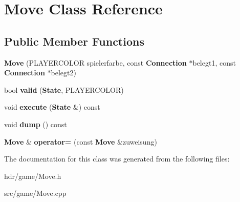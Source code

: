 \section{Move Class Reference}
\label{class_move}
\subsection*{Public Member Functions}
\begin{DoxyCompactItemize}
\item 
{\bfseries Move} (P\-L\-A\-Y\-E\-R\-C\-O\-L\-O\-R spielerfarbe, const {\bf Connection} $\ast$belegt1, const {\bf Connection} $\ast$belegt2)\label{class_move_a6040abbc43f535592305cb0c09b9be0a}

\item 
bool {\bfseries valid} ({\bf State}, P\-L\-A\-Y\-E\-R\-C\-O\-L\-O\-R)\label{class_move_a2651074156a1ab353be5f9b8c64649ee}

\item 
void {\bfseries execute} ({\bf State} \&) const \label{class_move_ae647057baca3c5d56261887a4eb2206f}

\item 
void {\bfseries dump} () const \label{class_move_a5fd65957977d9e30fd8898fa4a14ac56}

\item 
{\bf Move} \& {\bfseries operator=} (const {\bf Move} \&zuweisung)\label{class_move_a2cae41881447ddc9496cff2800ce01e2}

\end{DoxyCompactItemize}


The documentation for this class was generated from the following files\-:\begin{DoxyCompactItemize}
\item 
hdr/game/Move.\-h\item 
src/game/Move.\-cpp\end{DoxyCompactItemize}
